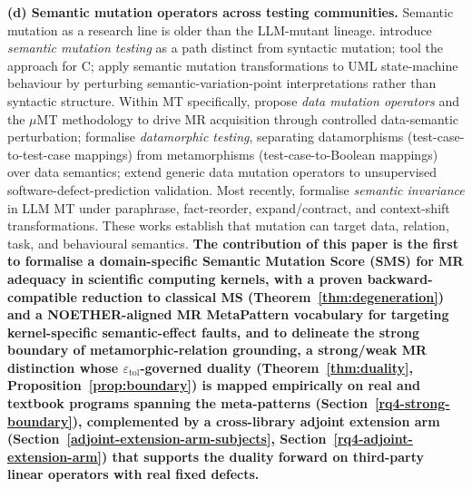 \documentclass[manuscript,screen,review]{acmart}
\begin{document}
\textbf{(d) Semantic mutation operators across testing communities.}
Semantic mutation as a research line is older than the LLM-mutant
lineage. \citet{7a6c280d9584691800e71876c716ea229335abeb} introduce \emph{semantic
mutation testing} as a path distinct from syntactic mutation; \citet{dan2012smtc}
tool the approach for C; \citet{derezinska2019uml}
apply semantic mutation transformations to UML state-machine behaviour
by perturbing semantic-variation-point interpretations rather than
syntactic structure. Within MT specifically, \citet{sun2016mumt,sun2024datamutation}
propose \emph{data mutation operators} and the $\mu$MT methodology to drive
MR acquisition through controlled data-semantic perturbation; \citet{zhu2020datamorphic}
formalise \emph{datamorphic testing}, separating
datamorphisms (test-case-to-test-case mappings) from metamorphisms
(test-case-to-Boolean mappings) over data semantics; \citet{chan2024metamorphic}
extend generic data mutation operators to unsupervised
software-defect-prediction validation. Most recently, \citet{0fa97cc4e2a0ffb6a777669b1b541c0372fac0d2}
formalise \emph{semantic invariance} in LLM MT under paraphrase,
fact-reorder, expand/contract, and context-shift transformations. These
works establish that mutation can target data, relation, task, and
behavioural semantics. \textbf{The contribution of this paper is the
first to formalise a domain-specific Semantic Mutation Score (SMS) for
MR adequacy in scientific computing kernels, with a proven
backward-compatible reduction to classical MS (Theorem~\ref{thm:degeneration}) and a
NOETHER-aligned MR MetaPattern vocabulary for targeting
kernel-specific semantic-effect faults, and to delineate the strong boundary
of metamorphic-relation grounding, a strong/weak MR distinction whose
$\varepsilon_{\mathrm{tol}}$-governed duality (Theorem~\ref{thm:duality}, Proposition~\ref{prop:boundary})
is mapped empirically on real and textbook programs spanning the
meta-patterns (Section~\ref{rq4-strong-boundary}), complemented by a cross-library adjoint extension
arm (Section~\ref{adjoint-extension-arm-subjects}, Section~\ref{rq4-adjoint-extension-arm}) that supports the duality forward on third-party
linear operators with real fixed defects.}
\end{document}
